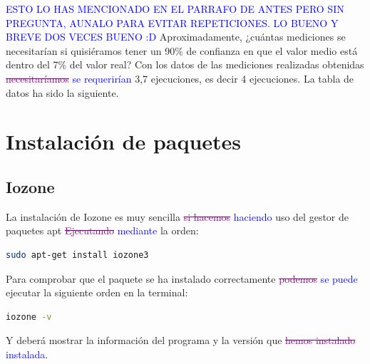 \textcolor{blue}{ESTO LO HAS MENCIONADO EN EL PARRAFO DE ANTES PERO SIN PREGUNTA, AUNALO PARA EVITAR REPETICIONES. LO BUENO Y BREVE DOS VECES BUENO :D} Aproximadamente, ¿cuántas mediciones se necesitarían si quisiéramos tener un 90\% de confianza en que el valor medio está dentro del 7\% del valor real? Con los datos de las mediciones realizadas obtenidas \textcolor{purple}{\sout{necesitaríamos}} \textcolor{blue}{se requerirían} 3,7 ejecuciones, es decir 4 ejecuciones. La tabla de datos ha sido la siguiente.

\begin{table}[h]
    \centering
    \caption{Productividad y número de ejecuciones necesarias para KnowSeq}
    \label{tab:my_label}
\end{table}
\begin{table}[h]
    \centering
\end{table}

\section{Instalación de paquetes}
\subsection{Iozone}
La instalación de Iozone es muy sencilla \textcolor{purple}{\sout{si hacemos}} \textcolor{blue}{haciendo} uso del gestor de paquetes apt \textcolor{purple}{\sout{Ejecutando}} \textcolor{blue}{mediante} la orden: 
\begin{lstlisting}[language=bash]
sudo apt-get install iozone3
\end{lstlisting}
Para comprobar que el paquete se ha instalado correctamente \textcolor{purple}{\sout{podemos}} \textcolor{blue}{se puede} ejecutar la siguiente orden en la terminal:
\begin{lstlisting}[language=bash]
iozone -v
\end{lstlisting}
Y deberá mostrar la información del programa y la versión que \textcolor{purple}{\sout{hemos instalado}} \textcolor{blue}{instalada}.

